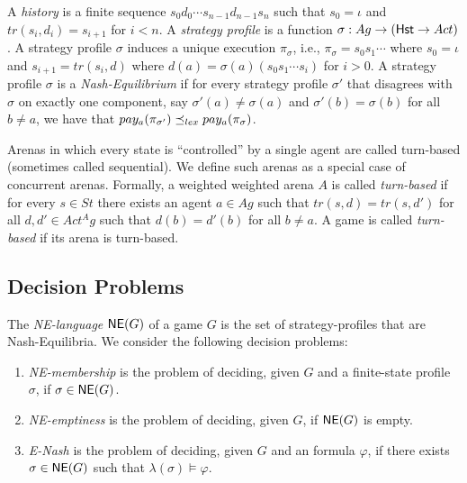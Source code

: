 A \emph{history} is a finite sequence $s_0 d_0 \cdots s_{n-1} d_{n-1} s_n$ such that $s_0 = \iota$ and $tr(s_i,d_i) = s_{i+1}$ for $i < n$.
A \emph{strategy profile} is a function $\sigma: Ag \to ({\sf Hst} \to Act)$. A strategy profile $\sigma$ induces a unique execution $\pi_\sigma$, i.e., $\pi_\sigma = s_0 s_1 \cdots$ where $s_0 = \iota$ and $s_{i+1} = tr(s_i,d)$ where $d(a) = \sigma(a)(s_0 s_1 \cdots s_i)$ for $i > 0$.
A strategy profile $\sigma$ is a \emph{Nash-Equilibrium} if for every strategy profile $\sigma'$ that disagrees with $\sigma$ on exactly one component, say $\sigma'(a) \neq \sigma(a)$ and $\sigma'(b) = \sigma(b)$ for all $b \neq a$, we have that $pay_a(\pi_{\sigma'})  \preceq_{lex}  pay_a(\pi_\sigma)$.


 Arenas in which every state is ``controlled'' by a single agent are called turn-based (sometimes called sequential). We define such arenas as a special case of concurrent arenas. Formally, 
a weighted weighted arena $A$ is called \emph{turn-based} if for every $s \in St$ there exists an agent $a \in Ag$ such that
$tr(s,d) = tr(s,d')$ for all $d,d' \in Act^Ag$ such that $d(b) = d'(b)$ for all $b \neq a$. A game is called \emph{turn-based} if its arena is turn-based.


\subsection{Decision Problems}

The \emph{NE-language ${\sf NE}(G)$} of a game $G$ is the set of strategy-profiles that are Nash-Equilibria. We consider the following decision problems:

\begin{enumerate}
 \item \emph{NE-membership} is the problem of deciding, given $G$ and a finite-state profile $\sigma$, if $\sigma \in {\sf NE}(G)$.
 \item \emph{NE-emptiness} is the problem of deciding, given $G$, if ${\sf NE}(G)$ is empty.
 \item \emph{E-Nash} is the problem of deciding, given $G$ and an \LTL formula $\varphi$, if there exists $\sigma \in {\sf NE}(G)$ such that $\lambda(\sigma) \models \varphi$.
\end{enumerate}

